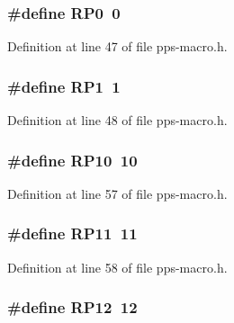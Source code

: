 \hypertarget{pps-macro_8h_ad7f94f08cea2af4ebea73fe81a7cec27}{}
\subsubsection[{R\+P0}]{\setlength{\rightskip}{0pt plus 5cm}\#define R\+P0~0}\label{pps-macro_8h_ad7f94f08cea2af4ebea73fe81a7cec27}


Definition at line 47 of file pps-\/macro.\+h.

\hypertarget{pps-macro_8h_a2aa775a4783b0ab418a08cbf991f99f0}{}
\subsubsection[{R\+P1}]{\setlength{\rightskip}{0pt plus 5cm}\#define R\+P1~1}\label{pps-macro_8h_a2aa775a4783b0ab418a08cbf991f99f0}


Definition at line 48 of file pps-\/macro.\+h.

\hypertarget{pps-macro_8h_a70239858a0e7e60eac0039884b69d279}{}
\subsubsection[{R\+P10}]{\setlength{\rightskip}{0pt plus 5cm}\#define R\+P10~10}\label{pps-macro_8h_a70239858a0e7e60eac0039884b69d279}


Definition at line 57 of file pps-\/macro.\+h.

\hypertarget{pps-macro_8h_a8d5a65e77bb0ec2123be8f71e2051e49}{}
\subsubsection[{R\+P11}]{\setlength{\rightskip}{0pt plus 5cm}\#define R\+P11~11}\label{pps-macro_8h_a8d5a65e77bb0ec2123be8f71e2051e49}


Definition at line 58 of file pps-\/macro.\+h.

\hypertarget{pps-macro_8h_a5e8b3e132607a50d793236d341db98cc}{}
\subsubsection[{R\+P12}]{\setlength{\rightskip}{0pt plus 5cm}\#define R\+P12~12}\label{pps-macro_8h_a5e8b3e132607a50d793236d341db98cc}


